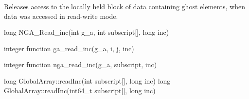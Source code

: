 \documentclass[10pt]{article}
\begin{document}
\local

\begin{desc}

Releases access to the locally held block of data containing ghost elements,
when data was accessed in read-write mode.

\end{desc}



\begin{capi}
\begin{ccode}
long NGA_Read_inc(int g_a, int subscript[], long inc)
\end{ccode}
\begin{funcargs}
\end{funcargs}
\end{capi}

\begin{f2dapi}
\begin{fcode}
integer function ga_read_inc(g_a, i, j, inc)
\end{fcode}
\begin{funcargs}
\end{funcargs}
\end{f2dapi}

\begin{fapi}
\begin{fcode}
integer function nga_read_inc(g_a, subscript, inc)
\end{fcode}
\begin{funcargs}
\end{funcargs}
\end{fapi}

\begin{cxxapi}
\begin{cxxcode}
long GlobalArray::readInc(int subscript[], long inc)
long GlobalArray::readInc(int64_t subscript[], long inc)
\end{cxxcode}
\begin{funcargs}
\end{funcargs}
\end{cxxapi}
\end{document}
